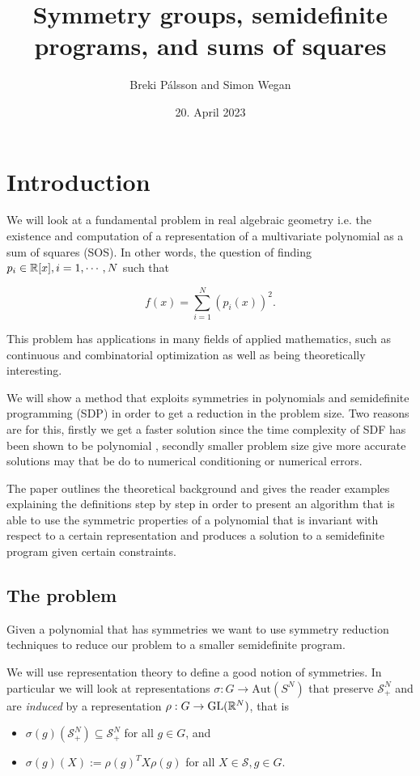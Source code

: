 \documentclass[]{article}
\begin{document}
\title{Symmetry groups, semidefinite programs, and sums of squares}
\author{Breki Pálsson and Simon Wegan}
\date{20. April 2023}

\maketitle

\section{Introduction}
We will look at a fundamental problem in real algebraic geometry i.e. the existence and computation of a
representation of a multivariate polynomial as a sum of squares (SOS). In other words, the
question of finding $p_i \in \mathbb R[x], i = 1, \cdots, N$ such that

\[f(x) = \sum_{i=1}^{N}(p_i(x))^2.\]

This problem has applications in many fields of applied mathematics, such as continuous and combinatorial optimization as well as being theoretically interesting. 


We will show a method that exploits symmetries in polynomials and semidefinite programming (SDP) in order to get a reduction in the problem size. 
Two reasons are for this, firstly we get a faster solution since the time complexity of SDF has been shown to be polynomial , 
secondly smaller problem size give more accurate solutions may that be do to numerical conditioning or numerical errors.


The paper outlines the theoretical background and gives the reader examples explaining the definitions step by step in order to present an algorithm that is able to use the 
symmetric properties of a polynomial that is invariant with respect to a certain representation and produces a solution to a semidefinite program given certain constraints.

\subsection*{The problem}

Given a polynomial that has symmetries we want to use symmetry reduction techniques to reduce our problem to a smaller semidefinite program.

We will use representation theory to define a good notion of symmetries. In particular we will look at representations
$\sigma:G\rightarrow \mathrm{Aut}(S^N)$ that preserve $\mathcal{S}_+^N$ and are \textit{induced} by a representation $\rho:G\rightarrow \mathrm{GL}(\mathbb R^N)$, 
that is 
\begin{itemize}
    \item $\sigma(g)(\mathcal{S}_+^N)\subseteq \mathcal{S}_+^N$ for all $g\in G$, and
    \item $\sigma(g)(X) := \rho(g)^TX\rho(g)$ for all $X\in \mathcal{S} , g\in G.$
\end{itemize}
\end{document}
